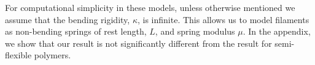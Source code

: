 \documentclass[pre,preprint]{revtex4-1}
\begin{document}

For computational simplicity in these models, unless otherwise mentioned we assume that the bending rigidity, $\kappa$, is infinite. This allows us to model filaments as non-bending springs of rest length, $L$, and spring modulus $\mu$.  In the appendix, we show that our result is not significantly different from the result for semi-flexible polymers.
\end{document}
